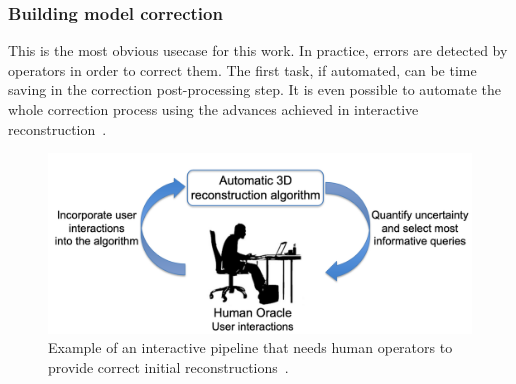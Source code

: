         \subsubsection{Building model correction}
            This is the most obvious usecase for this work.
            In practice, errors are detected by operators in order to correct them.
            The first task, if automated, can be time saving in the correction post-processing step.
            It is even possible to automate the whole correction process using the advances achieved in interactive reconstruction~\parencite{kowdle2011active}.
            \begin{figure}[H]
                \centering
                \includegraphics[width=\textwidth]{images/introduction/use/active_learning_kowdle}
                \caption{\label{fig::corrections} Example of an interactive pipeline that needs human operators to provide correct initial reconstructions~\parencite{kowdle2011active}.}
            \end{figure}

